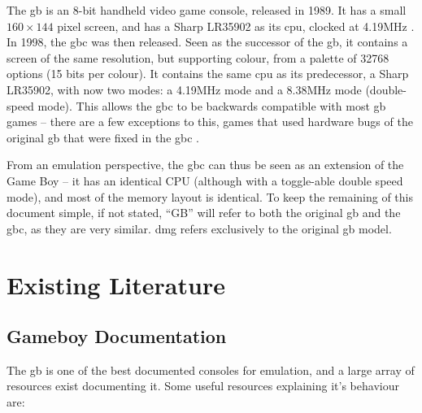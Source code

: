 \documentclass[11pt]{informatics-report}
\begin{document}
The \gls{gb} is an 8-bit handheld video game console, released in 1989. It has a small $160 \times 144$ pixel screen, and has a Sharp LR35902 as its \gls{cpu}, clocked at 4.19MHz \cite[Specifications]{pandoc}. In 1998, the \gls{gbc} was then released. Seen as the successor of the \gls{gb}, it contains a screen of the same resolution, but supporting colour, from a palette of 32768 options (15 bits per colour). It contains the same \gls{cpu} as its predecessor, a Sharp LR35902, with now two modes: a 4.19MHz mode and a 8.38MHz mode (double-speed mode). This allows the \gls{gbc} to be backwards compatible with most \gls{gb} games -- there are a few exceptions to this, games that used hardware bugs of the original \gls{gb} that were fixed in the \gls{gbc} \cite[STAT IRQ glitches]{bugs_in_emul}.

From an emulation perspective, the \glsdesc{gbc} can thus be seen as an extension of the Game Boy -- it has an identical CPU (although with a toggle-able double speed mode), and most of the memory layout is identical. To keep the remaining of this document simple, if not stated, ``GB'' will refer to both the original \glsdesc{gb} and the \glsdesc{gbc}, as they are very similar. \gls{dmg} refers exclusively to the original \glsdesc{gb} model.

\section{Existing Literature}

\subsection{Gameboy Documentation}

The \glsdesc{gb} is one of the best documented consoles for emulation, and a large array of resources exist documenting it. Some useful resources explaining it's behaviour are:
\end{document}
